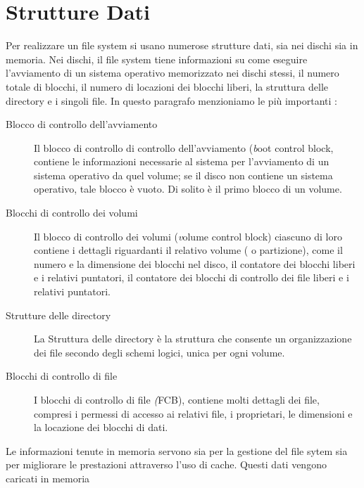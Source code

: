 	  \newpage
         \section{Strutture Dati}
         Per realizzare un file system si usano numerose strutture dati, sia nei dischi sia in memoria. Nei dischi, il file system tiene informazioni su come eseguire l'avviamento di un sistema operativo memorizzato nei dischi stessi, il numero totale di blocchi, il numero di locazioni dei blocchi liberi, la struttura delle directory e i singoli file. 
	 In questo paragrafo menzioniamo le più importanti : 
	  \begin{description}
	   \item[Blocco di controllo dell'avviamento] 
	    Il blocco di controllo di controllo dell'avviamento ({\emph boot control block}, contiene le informazioni necessarie al sistema per l'avviamento di un sistema operativo da quel volume; se il disco non contiene un sistema operativo, tale blocco è vuoto. Di solito è il primo blocco di un volume. 
 	  \end{description}
	  \begin{description}
	   \item[Blocchi di controllo dei volumi] 
	Il blocco di controllo dei volumi (\emph volume control block) ciascuno di loro contiene i dettagli riguardanti il relativo volume ( o partizione), come il numero e la dimensione dei blocchi nel disco, il contatore dei blocchi liberi e i relativi puntatori, il contatore dei blocchi di controllo dei file liberi e i relativi puntatori.
 	  \end{description}
	  \begin{description}
	   \item[Strutture delle directory]
	    La Struttura delle directory è la struttura che consente un organizzazione dei file secondo degli schemi logici, unica per ogni volume. 
 	  \end{description}
	  \begin{description}
	   \item[Blocchi di controllo di file]
	    I blocchi di controllo di file {\emph (FCB)}, contiene molti dettagli dei file, compresi i permessi di accesso ai relativi file, i proprietari, le dimensioni e la locazione dei blocchi di dati. 
 	  \end{description}
	  Le informazioni tenute in memoria servono sia per la gestione del file sytem sia per migliorare le prestazioni attraverso l'uso di cache. Questi dati vengono caricati in memoria 
